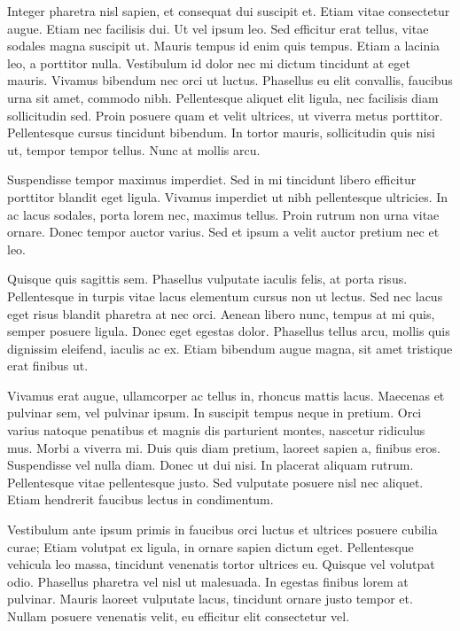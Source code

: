 Integer pharetra nisl sapien, et consequat dui suscipit et. Etiam vitae consectetur augue. Etiam nec facilisis dui. Ut vel ipsum leo. Sed efficitur erat tellus, vitae sodales magna suscipit ut. Mauris tempus id enim quis tempus. Etiam a lacinia leo, a porttitor nulla. Vestibulum id dolor nec mi dictum tincidunt at eget mauris. Vivamus bibendum nec orci ut luctus. Phasellus eu elit convallis, faucibus urna sit amet, commodo nibh. Pellentesque aliquet elit ligula, nec facilisis diam sollicitudin sed. Proin posuere quam et velit ultrices, ut viverra metus porttitor. Pellentesque cursus tincidunt bibendum. In tortor mauris, sollicitudin quis nisi ut, tempor tempor tellus. Nunc at mollis arcu.

Suspendisse tempor maximus imperdiet. Sed in mi tincidunt libero efficitur porttitor blandit eget ligula. Vivamus imperdiet ut nibh pellentesque ultricies. In ac lacus sodales, porta lorem nec, maximus tellus. Proin rutrum non urna vitae ornare. Donec tempor auctor varius. Sed et ipsum a velit auctor pretium nec et leo.

Quisque quis sagittis sem. Phasellus vulputate iaculis felis, at porta risus. Pellentesque in turpis vitae lacus elementum cursus non ut lectus. Sed nec lacus eget risus blandit pharetra at nec orci. Aenean libero nunc, tempus at mi quis, semper posuere ligula. Donec eget egestas dolor. Phasellus tellus arcu, mollis quis dignissim eleifend, iaculis ac ex. Etiam bibendum augue magna, sit amet tristique erat finibus ut.

Vivamus erat augue, ullamcorper ac tellus in, rhoncus mattis lacus. Maecenas et pulvinar sem, vel pulvinar ipsum. In suscipit tempus neque in pretium. Orci varius natoque penatibus et magnis dis parturient montes, nascetur ridiculus mus. Morbi a viverra mi. Duis quis diam pretium, laoreet sapien a, finibus eros. Suspendisse vel nulla diam. Donec ut dui nisi. In placerat aliquam rutrum. Pellentesque vitae pellentesque justo. Sed vulputate posuere nisl nec aliquet. Etiam hendrerit faucibus lectus in condimentum.

Vestibulum ante ipsum primis in faucibus orci luctus et ultrices posuere cubilia curae; Etiam volutpat ex ligula, in ornare sapien dictum eget. Pellentesque vehicula leo massa, tincidunt venenatis tortor ultrices eu. Quisque vel volutpat odio. Phasellus pharetra vel nisl ut malesuada. In egestas finibus lorem at pulvinar. Mauris laoreet vulputate lacus, tincidunt ornare justo tempor et. Nullam posuere venenatis velit, eu efficitur elit consectetur vel.

